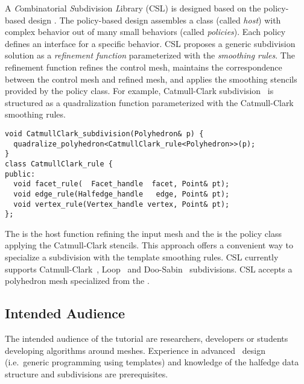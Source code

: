 \documentclass[letter,twocolumn]{article}
\begin{document}
A \emph{C}ombinatorial \emph{S}ubdivision \emph{L}ibrary 
(CSL) is designed based on the policy-based design 
\cite{Alexandrescu:2001:MCD}.
The policy-based design assembles a class
(called \emph{host}) with complex behavior out of many 
small behaviors (called \emph{policies}).
Each policy defines an interface for a
specific behavior. CSL proposes a 
generic subdivision solution as a \emph{refinement function}
parameterized with the \emph{smoothing rules}.
The refinement function refines the control mesh,
maintains the correspondence between the control mesh and refined
mesh, and applies the smoothing stencils provided by the policy
class. For example, Catmull-Clark subdivision~\cite{cc} is structured
as a quadralization function parameterized with the Catmull-Clark
smoothing rules.
\begin{lstlisting}
void CatmullClark_subdivision(Polyhedron& p) {    
  quadralize_polyhedron<CatmullClark_rule<Polyhedron>>(p);  
}
class CatmullClark_rule {
public:
  void facet_rule(  Facet_handle  facet, Point& pt);
  void edge_rule(Halfedge_handle   edge, Point& pt);
  void vertex_rule(Vertex_handle vertex, Point& pt);
};
\end{lstlisting}

\noindent The  
is the host function refining the input mesh
and the  is the policy 
class applying the Catmull-Clark stencils.
This approach offers a convenient way to
specialize a subdivision with the template smoothing rules.
CSL currently supports Catmull-Clark~\cite{cc}, 
Loop~\cite{loop} and Doo-Sabin~\cite{ds} subdivisions.
CSL accepts a polyhedron mesh specialized from the
\cgalpoly .  


\subsection*{Intended Audience}

The intended audience of the tutorial are researchers, developers or
students developing algorithms around meshes. Experience in advanced
\CC\ design (i.e.\ generic programming using templates) and knowledge
of the halfedge data structure and subdivisions are prerequisites.

{\footnotesize


}
\end{document}
